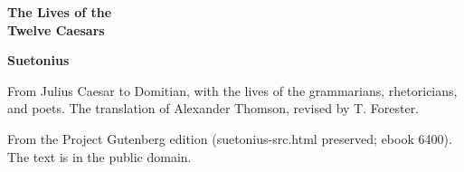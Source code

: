 \documentclass[11pt,letterpaper]{article}
\begin{document}
\color{ink}

\begin{titlepage}
\centering
\vspace*{4em}
{\LARGE\bfseries\color{heading} The Lives of the\\[0.3em]Twelve Caesars\par}
\vspace{2em}
{\Large\bfseries\color{heading} Suetonius\par}
\vspace{2.5em}
{\itshape\color{subhead}\parbox{0.8\linewidth}{\centering From Julius Caesar to Domitian, with the lives of the grammarians, rhetoricians, and poets. The translation of Alexander Thomson, revised by T. Forester.\par}}
\vfill
{\small From the Project Gutenberg edition (suetonius-src.html preserved; ebook 6400). The text is in the public domain.\par}
\vspace{2em}
\end{titlepage}

\tableofcontents


\end{document}

